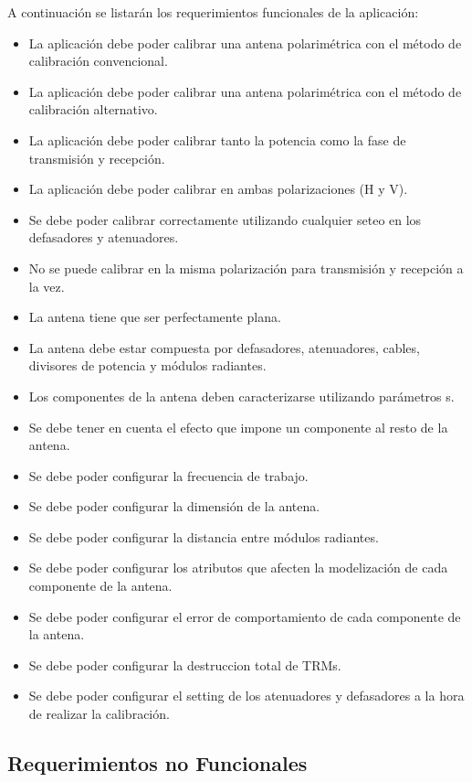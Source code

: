 \documentclass[a4paper,10pt]{article}
\begin{document}
    A continuación se listarán los requerimientos funcionales de la aplicación:

\begin{itemize}
    \item La aplicación debe poder calibrar una antena polarimétrica con el 
método de calibración convencional.
    \item La aplicación debe poder calibrar una antena polarimétrica con el
método de calibración alternativo.
    \item La aplicación debe poder calibrar tanto la potencia como la fase de
transmisión y recepción.
    \item La aplicación debe poder calibrar en ambas polarizaciones (H y V).
    \item Se debe poder calibrar correctamente utilizando cualquier seteo en los
defasadores y atenuadores.
    \item No se puede calibrar en la misma polarización para transmisión y 
recepción a la vez.
    \item La antena tiene que ser perfectamente plana.
    \item La antena debe estar compuesta por defasadores, atenuadores, cables, 
divisores de potencia y módulos radiantes.
    \item Los componentes de la antena deben caracterizarse utilizando 
parámetros s.
    \item Se debe tener en cuenta el efecto que impone un componente al resto de
la antena.
    \item Se debe poder configurar la frecuencia de trabajo.
    \item Se debe poder configurar la dimensión de la antena.
    \item Se debe poder configurar la distancia entre módulos radiantes.
    \item Se debe poder configurar los atributos que afecten la modelización de
cada componente de la antena.
    \item Se debe poder configurar el error de comportamiento de cada
componente de la antena.
    \item Se debe poder configurar la destruccion total de TRMs.
    \item Se debe poder configurar el setting de los atenuadores y defasadores
a la hora de realizar la calibración. 
\end{itemize}

\subsection{Requerimientos no Funcionales}
\end{document}

